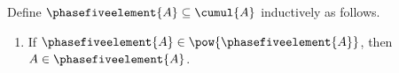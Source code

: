 \begin{inductive}\label{phase5_nested_recursive_element}
    Define $\phasefiveelement{A}\subseteq\cumul{A}$ inductively as follows.
    \begin{enumerate}
        \item If $\phasefiveelement{A}\in\pow{\phasefiveelement{A}}$, then
            $A\in\phasefiveelement{A}$.
    \end{enumerate}
\end{inductive}
